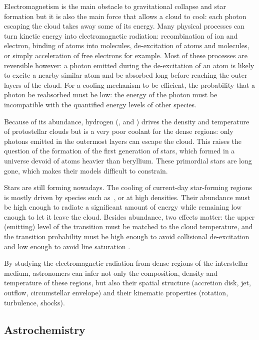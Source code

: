 Electromagnetism is the main obstacle to gravitational collapse and star formation but it is also the main force that allows a cloud to cool: each photon escaping the cloud takes away some of its energy.
Many physical processes can turn kinetic energy into electromagnetic radiation:
recombination of ion and electron, binding of atoms into molecules, de-excitation of atoms and molecules, or simply acceleration of free electrons for example.
Most of these processes are reversible however: a photon emitted during the de-excitation of an atom is likely to excite a nearby similar atom and be absorbed long before reaching the outer layers of the cloud.
For a cooling mechanism to be efficient, the probability that a photon be reabsorbed must be low: the energy of the photon must be incompatible with the quantified energy levels of other species.

Because of its abundance, hydrogen (,  and ) drives the density and temperature of protostellar clouds but is a very poor coolant for the dense regions: only photons emitted in the outermost layers can escape the cloud.
This raises the question of the formation of the first generation of stars,
which formed in a universe devoid of atoms heavier than beryllium.
These primordial stars are long gone, which makes their models difficult to constrain.

Stars are still forming nowadays.
The cooling of current-day star-forming regions is mostly driven by species such as~, or  at high densities.
Their abundance must be high enough to radiate a significant amount of energy while remaining low enough to let it leave the cloud.
Besides abundance, two effects matter: the upper (emitting) level of the transition must be matched to the cloud temperature, and the transition probability must be high enough to avoid collisional de-excitation and low enough to avoid line saturation
\parencite{tielens2005physics,draine2010physics}.

By studying the electromagnetic radiation from dense regions of the interstellar medium, astronomers can infer not only the composition, density and temperature of these regions, but also their spatial structure (accretion disk, jet, outflow, circumstellar envelope) and their kinematic properties (rotation, turbulence, shocks).



\subsection{Astrochemistry}

